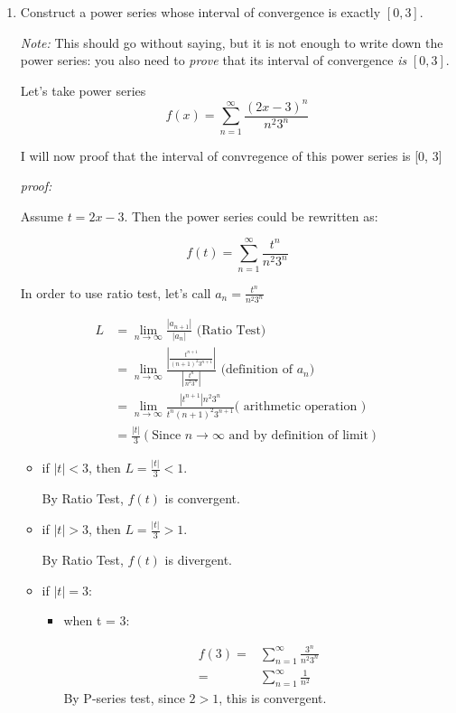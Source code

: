 \documentclass[12pt]{exam}
\newcommand {\DS} [1] {${\displaystyle #1}$}
\begin{document}
\begin{enumerate}

\item Construct a power series whose interval of convergence is exactly \DS{[0,3]}. 

\emph{Note:}  This should go without saying, but it is not enough to write down the power series: you also need to \emph{prove} that its interval of convergence \emph{is} \DS{[0,3].}

Let's take power series $$f(x) = \sum_{n = 1}^{\infty} \frac{(2x-3)^n}{n^2 3^n}$$

I will now proof that the interval of convregence of this power series is [0, 3]

\emph{proof:}

Assume $t = 2x - 3$. Then the power series could be rewritten as:

$$f(t) = \sum_{n = 1}^{\infty} \frac{t^n}{n^2 3^n}$$

In order to use ratio test, let's call $a_n =  \frac{t^n}{n^2 3^n}$

\begin{align*}
	L &= \lim_{n \to \infty} \frac{|a_{n + 1}|}{|a_n|} \mbox{ (Ratio Test) } \\
	&= \lim_{n \to \infty} \frac{|\frac{t^{n + 1}}{(n + 1)^2 3^{n + 1}}|}{|\frac{t^n}{n^2 3^n}|} \mbox{ (definition of } a_n ) \\
	&= \lim_{n \to \infty} \frac{|t^{n + 1}| n^2 3^n}{ t^n(n + 1)^2 3^{n + 1}} \mbox{( arithmetic operation )} \\
	&= \frac{|t|}{3} ( \mbox{Since } n \to \infty \mbox{ and by definition of limit})
\end{align*}

\begin{itemize}
	\item if $|t| < 3$, then $L = \frac{|t|}{3} < 1$.

	By Ratio Test, $f(t)$ is convergent.

	\item if $|t| > 3$, then $L = \frac{|t|}{3} > 1$.

	By Ratio Test, $f(t)$ is divergent.

	\item if $|t| = 3$:

	\begin{itemize}
		\item when t = 3:

		\begin{align*}
			f(3) 
			=& \sum_{n = 1}^{\infty} \frac{3^n}{n^2 3^n} \\
			=& \sum_{n = 1}^{\infty} \frac{1}{n^2}
		\end{align*}
		By P-series test, since $2 > 1$, this is convergent.
		

\end{itemize}
\end{itemize}
\end{enumerate}
\end{document}
